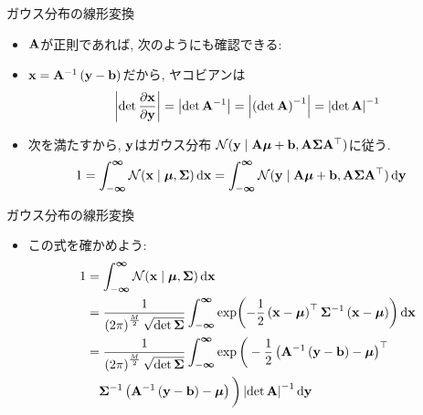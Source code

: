 \documentclass[dvipdfmx,notheorems,t]{beamer}
\begin{document}
\begin{frame}{ガウス分布の線形変換}
\begin{itemize}
  \item $\vb{A}$が正則であれば, 次のようにも確認できる:
  \item $\vb{x} = \vb{A}^{-1} \left( \vb{y} - \vb{b} \right)$だから, ヤコビアンは
  \begin{align*}
    \left| \det \pdv{\vb{x}}{\vb{y}} \right| = \left| \det \vb{A}^{-1} \right|
      = \left| \left( \det \vb{A} \right)^{-1} \right| = \left| \det \vb{A} \right|^{-1}
  \end{align*}
  \item 次を満たすから, $\vb{y}$はガウス分布
  $\mathcal{N}(\vb{y} \mid \vb{A} \vb*{\mu} + \vb{b}, \vb{A} \vb{\Sigma} \vb{A}^\top)$に従う.
  \begin{align*}
    1 &= \int_{-\boldsymbol{\infty}}^{\boldsymbol{\infty}}
      \mathcal{N}(\vb{x} \mid \vb*{\mu}, \vb{\Sigma}) \dd{\vb{x}}
      = \int_{-\boldsymbol{\infty}}^{\boldsymbol{\infty}}
      \mathcal{N}(\vb{y} \mid \vb{A} \vb*{\mu} + \vb{b}, \vb{A} \vb{\Sigma} \vb{A}^\top) \dd{\vb{y}}
  \end{align*}
\end{itemize}
\end{frame}

\begin{frame}{ガウス分布の線形変換}
\begin{itemize}
  \item この式を確かめよう:
  \begin{align*}
    1 &= \int_{-\boldsymbol{\infty}}^{\boldsymbol{\infty}}
      \mathcal{N}(\vb{x} \mid \vb*{\mu}, \vb{\Sigma}) \dd{\vb{x}} \\
    &= \frac{1}{\left( 2\pi \right)^\frac{M}{2} \sqrt{\det \vb{\Sigma}}}
      \int_{-\boldsymbol{\infty}}^{\boldsymbol{\infty}}
      \exp(-\frac{1}{2} \left( \vb{x} - \vb*{\mu} \right)^\top \vb{\Sigma}^{-1}
      \left( \vb{x} - \vb*{\mu} \right)) \dd{\vb{x}} \\
    &= \frac{1}{\left( 2\pi \right)^\frac{M}{2} \sqrt{\det \vb{\Sigma}}}
      \int_{-\boldsymbol{\infty}}^{\boldsymbol{\infty}}
      \exp \bigg( -\frac{1}{2} \left( \vb{A}^{-1} \left( \vb{y} - \vb{b} \right) - \vb*{\mu} \right)^\top \\
    & \quad \vb{\Sigma}^{-1} \left( \vb{A}^{-1} \left( \vb{y} - \vb{b} \right) - \vb*{\mu} \right) \bigg)
      \left| \det \vb{A} \right|^{-1} \dd{\vb{y}}
  \end{align*}
\end{itemize}
\end{frame}
\end{document}
